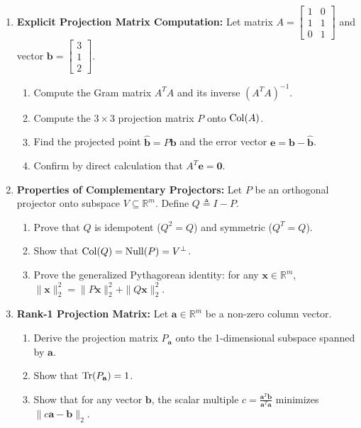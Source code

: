 \begin{enumerate}[label=\textbf{P\arabic*.}]
    \item \textbf{Explicit Projection Matrix Computation:}
    Let matrix $A = \begin{bmatrix} 1 & 0 \\ 1 & 1 \\ 0 & 1 \end{bmatrix}$ and vector $\mathbf{b} = \begin{bmatrix} 3 \\ 1 \\ 2 \end{bmatrix}$.
    \begin{enumerate}[label=(\alph*)]
        \item Compute the Gram matrix $A^T A$ and its inverse $(A^T A)^{-1}$.
        \item Compute the $3 \times 3$ projection matrix $P$ onto $\operatorname{Col}(A)$.
        \item Find the projected point $\hat{\mathbf{b}} = P\mathbf{b}$ and the error vector $\mathbf{e} = \mathbf{b} - \hat{\mathbf{b}}$.
        \item Confirm by direct calculation that $A^T \mathbf{e} = \mathbf{0}$.
    \end{enumerate}

    \item \textbf{Properties of Complementary Projectors:}
    Let $P$ be an orthogonal projector onto subspace $V \subseteq \mathbb{R}^m$. Define $Q \triangleq I - P$.
    \begin{enumerate}[label=(\alph*)]
        \item Prove that $Q$ is idempotent ($Q^2 = Q$) and symmetric ($Q^T = Q$).
        \item Show that $\operatorname{Col}(Q) = \operatorname{Null}(P) = V^\perp$.
        \item Prove the generalized Pythagorean identity: for any $\mathbf{x} \in \mathbb{R}^m$, $\|\mathbf{x}\|_2^2 = \|P\mathbf{x}\|_2^2 + \|Q\mathbf{x}\|_2^2$.
    \end{enumerate}

    \item \textbf{Rank-1 Projection Matrix:}
    Let $\mathbf{a} \in \mathbb{R}^m$ be a non-zero column vector.
    \begin{enumerate}[label=(\alph*)]
        \item Derive the projection matrix $P_{\mathbf{a}}$ onto the 1-dimensional subspace spanned by $\mathbf{a}$.
        \item Show that $\operatorname{Tr}(P_{\mathbf{a}}) = 1$.
        \item Show that for any vector $\mathbf{b}$, the scalar multiple $c = \frac{\mathbf{a}^T \mathbf{b}}{\mathbf{a}^T \mathbf{a}}$ minimizes $\|c\mathbf{a} - \mathbf{b}\|_2$.
    \end{enumerate}


\end{enumerate}
